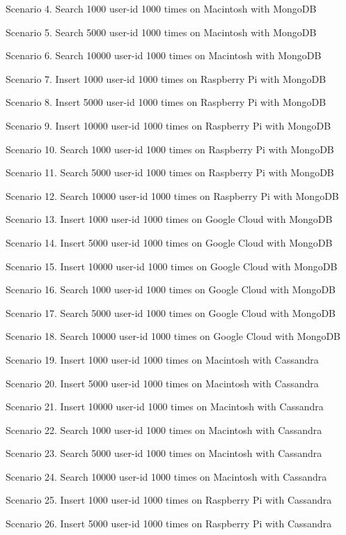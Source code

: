 Scenario 4. Search 1000 user-id 1000 times on Macintosh with MongoDB 

Scenario 5. Search 5000 user-id 1000 times on Macintosh with MongoDB 

Scenario 6. Search 10000 user-id 1000 times on Macintosh with MongoDB 


Scenario 7. Insert 1000 user-id 1000 times on Raspberry Pi with MongoDB 

Scenario 8. Insert 5000 user-id 1000 times on Raspberry Pi with MongoDB 

Scenario 9. Insert 10000 user-id 1000 times on Raspberry Pi with MongoDB 

Scenario 10. Search 1000 user-id 1000 times on Raspberry Pi with MongoDB 

Scenario 11. Search 5000 user-id 1000 times on Raspberry Pi with MongoDB 

Scenario 12. Search 10000 user-id 1000 times on Raspberry Pi with MongoDB 


Scenario 13. Insert 1000 user-id 1000 times on Google Cloud with MongoDB 

Scenario 14. Insert 5000 user-id 1000 times on Google Cloud with MongoDB 

Scenario 15. Insert 10000 user-id 1000 times on Google Cloud with MongoDB 

Scenario 16. Search 1000 user-id 1000 times on Google Cloud with MongoDB 

Scenario 17. Search 5000 user-id 1000 times on Google Cloud with MongoDB 

Scenario 18. Search 10000 user-id 1000 times on Google Cloud with MongoDB 




Scenario 19. Insert 1000 user-id 1000 times on Macintosh with Cassandra 

Scenario 20. Insert 5000 user-id 1000 times on Macintosh with Cassandra 

Scenario 21. Insert 10000 user-id 1000 times on Macintosh with Cassandra 

Scenario 22. Search 1000 user-id 1000 times on Macintosh with Cassandra 

Scenario 23. Search 5000 user-id 1000 times on Macintosh with Cassandra 

Scenario 24. Search 10000 user-id 1000 times on Macintosh with Cassandra 


Scenario 25. Insert 1000 user-id 1000 times on Raspberry Pi with Cassandra 

Scenario 26. Insert 5000 user-id 1000 times on Raspberry Pi with Cassandra 

